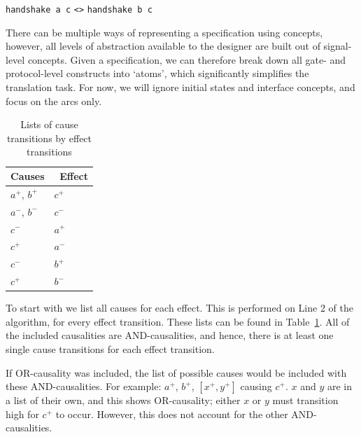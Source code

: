 \documentclass[british, 10pt, conference, compsocconf]{IEEEtran}
\begin{document}
\vspace{-1.5mm}

\begin{center}
   \texttt{handshake a c} \texttt{<>} \texttt{handshake b c}
\end{center}

\vspace{-1.5mm}

\noindent There can be multiple ways of representing a specification using concepts, 
however, all levels of abstraction available to the designer are built out of signal-level
concepts. Given a specification, we can therefore break down 
all gate- and protocol-level constructs into `atoms', which significantly 
simplifies the translation task. For now, we will ignore initial states and interface
concepts, and focus on the arcs only.

\begin{table}[h]
\vspace{-2mm}
\caption{Lists of cause transitions by effect transitions
		\label{tab:list-of-concepts}}
  \centering
\begin{tabular}[htb]{| m{2.7cm} | m{2.0cm} |}
  \hline
Causes & \, Effect \\ \hline \hline
$a^{+}$, $b^{+}$		& $c^{+}$ 	\\ \hline
$a^{-}$, $b^{-}$ 		& $c^{-}$ 	\\ \hline
$c^{-}$			& $a^{+}$ 	\\ \hline
$c^{+}$			& $a^{-}$ 	\\ \hline
$c^{-}$			& $b^{+}$ 	\\ \hline
$c^{+}$			& $b^{-}$ 	\\ \hline
  \end{tabular}
  \vspace{-3mm}
\end{table}

To start with we list all causes for each effect. This is performed on Line 2 of the algorithm, for every effect transition. 
These lists can be found in Table~\ref{tab:list-of-concepts}.
All of the included causalities are AND-causalities, and hence, there
is at least one single cause transitions for each effect transition. 

If OR-causality was included, the list of possible causes would be included with these
AND-causalities. For example:  $a^{+}$, $b^{+}$, $[x^{+}, y^{+}]$ causing
$c^{+}$. $x$ and $y$ are in a list of their own, and this shows OR-causality;
either $x$ or $y$ must transition high for $c^{+}$ to occur. However, this does
not account for the other AND-causalities. 
\end{document}
